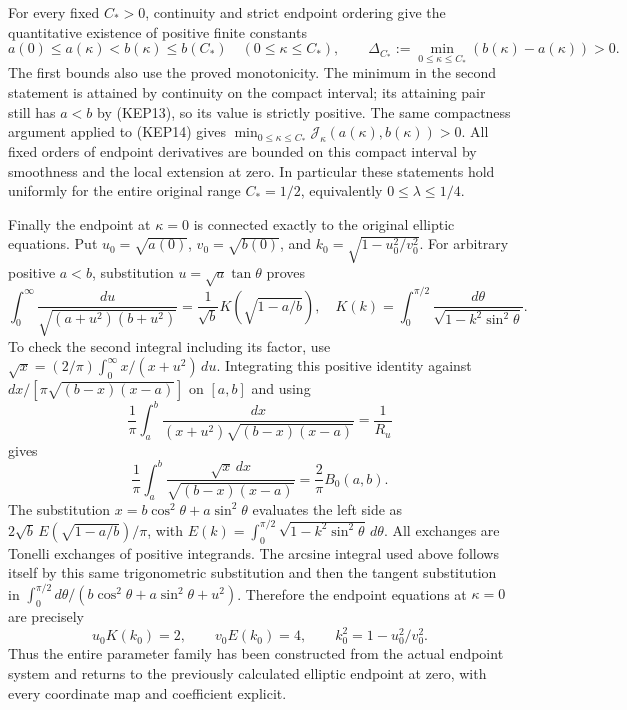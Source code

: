 \documentclass[11pt,a4paper]{article}
\begin{document}
For every fixed $C_*>0$, continuity and strict endpoint ordering give
the quantitative existence of positive finite constants
\begin{equation}\tag{KEP19}
 a(0)\leq a(\kappa)<b(\kappa)\leq b(C_*)\quad(0\leq \kappa\leq C_*),
 \qquad
 \Delta_{C_*}:=\min_{0\leq \kappa\leq C_*}(b(\kappa)-a(\kappa))>0.
\end{equation}
The first bounds also use the proved monotonicity. The minimum in the
second statement is attained by continuity on the compact interval;
its attaining pair still has $a<b$ by (KEP13), so its value is
strictly positive. The same compactness argument applied to (KEP14)
gives
$\min_{0\leq \kappa\leq C_*}\mathcal J_\kappa(a(\kappa),b(\kappa))>0$.
All fixed orders of endpoint derivatives are bounded on this compact
interval by smoothness and the local extension at zero.
In particular these statements hold uniformly for the entire original
range $C_*=1/2$, equivalently $0\leq\lambda\leq1/4$.

Finally the endpoint at $\kappa=0$ is connected exactly to the original
elliptic equations. Put $u_0=\sqrt{a(0)}$, $v_0=\sqrt{b(0)}$, and
$k_0=\sqrt{1-u_0^2/v_0^2}$. For arbitrary positive $a<b$, substitution
$u=\sqrt a\tan\theta$ proves
\[
 \int_0^\infty\frac{du}{\sqrt{(a+u^2)(b+u^2)}}
 =\frac1{\sqrt b}K\left(\sqrt{1-a/b}\right),
 \quad
 K(k)=\int_0^{\pi/2}\frac{d\theta}
                   {\sqrt{1-k^2\sin^2\theta}}.
\]
To check the second integral including its factor, use
$\sqrt{x}=(2/\pi)\int_0^\infty x/(x+u^2)\,du$.
Integrating this positive identity against
$dx/[\pi\sqrt{(b-x)(x-a)}]$ on $[a,b]$ and using
\[
 \frac1\pi\int_a^b
 \frac{dx}{(x+u^2)\sqrt{(b-x)(x-a)}}=\frac1{R_u}
\]
gives
\[
 \frac1\pi\int_a^b
 \frac{\sqrt{x}\,dx}{\sqrt{(b-x)(x-a)}}
 =\frac2\pi B_0(a,b).
\]
The substitution $x=b\cos^2\theta+a\sin^2\theta$ evaluates the
left side as $2\sqrt b\,E(\sqrt{1-a/b})/\pi$, with
$E(k)=\int_0^{\pi/2}\sqrt{1-k^2\sin^2\theta}\,d\theta$.
All exchanges are Tonelli exchanges of positive integrands. The
arcsine integral used above follows itself by this same trigonometric
substitution and then the tangent substitution in
$\int_0^{\pi/2}d\theta/(b\cos^2\theta+a\sin^2\theta+u^2)$.
Therefore the endpoint equations at $\kappa=0$ are precisely
\begin{equation}\tag{KEP20}
 u_0K(k_0)=2,\qquad v_0E(k_0)=4,
 \qquad k_0^2=1-u_0^2/v_0^2.
\end{equation}
Thus the entire parameter family has been constructed from the actual
endpoint system and returns to the previously calculated elliptic
endpoint at zero, with every coordinate map and coefficient explicit.
\end{document}
